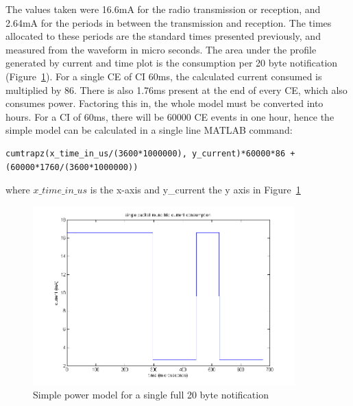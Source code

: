 \documentclass[]{article}
\begin{document}
The values taken were 16.6mA for the radio transmission or reception, and 2.64mA for the periods in between the transmission and reception. The times allocated to these periods are the standard times presented previously, and measured from the waveform in micro seconds. The area under the profile generated by current and time plot is the consumption per 20 byte notification (Figure~\ref{fig:model}). For a single \ac{CE} of \ac{CI} 60ms, the calculated current consumed is multiplied by 86. There is also 1.76ms present at the end of every \ac{CE}, which also consumes power. Factoring this in, the whole model must be converted into hours. For a \ac{CI} of 60ms, there will be 60000 \ac{CE} events in one hour, hence the simple model can be calculated in a single line MATLAB command:

\begin{lstlisting}
cumtrapz(x_time_in_us/(3600*1000000), y_current)*60000*86 + (60000*1760/(3600*1000000))
\end{lstlisting}

where $x\_time\_in\_us$ is the x-axis and y\_current the y axis in Figure~\ref{fig:model}


\begin{figure}[H]
	\begin{center}
		\includegraphics[width = 0.9\textwidth]{model}
	\end{center}
	\caption{Simple power model for a single full 20 byte notification}
	\label{fig:model}
\end{figure}
\end{document}
